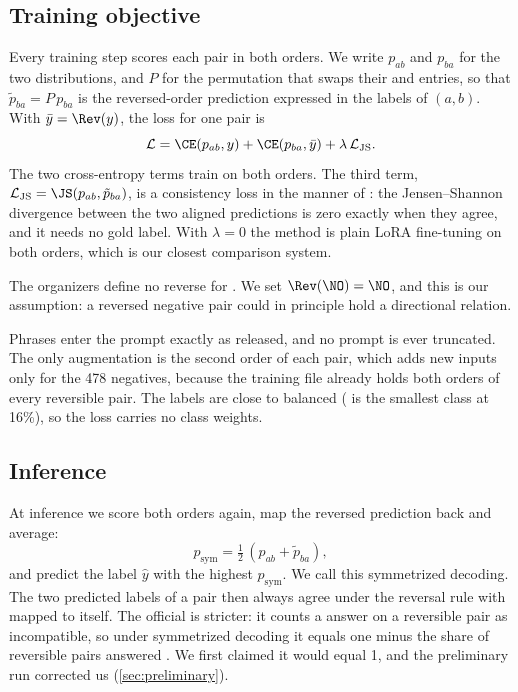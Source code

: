 \subsection{Training objective}

Every training step scores each pair in both orders. We write $p_{ab}$ and $p_{ba}$ for the two distributions, and $P$ for the permutation that swaps their \FW{} and \BW{} entries, so that $\tilde{p}_{ba} = P\,p_{ba}$ is the reversed-order prediction expressed in the labels of $(a,b)$. With $\bar{y} = \Rev(y)$, the loss for one pair is
\begin{equation}
\mathcal{L} = \CE(p_{ab}, y) + \CE(p_{ba}, \bar{y}) + \lambda\, \mathcal{L}_{\mathrm{JS}} .
\label{eq:loss}
\end{equation}
The two cross-entropy terms train on both orders. The third term, $\mathcal{L}_{\mathrm{JS}} = \JS(p_{ab}, \tilde{p}_{ba})$, is a consistency loss in the manner of \citet{li-etal-2019-logic}: the Jensen--Shannon divergence between the two aligned predictions is zero exactly when they agree, and it needs no gold label. With $\lambda = 0$ the method is plain LoRA fine-tuning on both orders, which is our closest comparison system.

The organizers define no reverse for \NO{}. We set $\Rev(\NO) = \NO$, and this is our assumption: a reversed negative pair could in principle hold a directional relation.

Phrases enter the prompt exactly as released, and no prompt is ever truncated. The only augmentation is the second order of each pair, which adds new inputs only for the 478 negatives, because the training file already holds both orders of every reversible pair. The labels are close to balanced (\NO{} is the smallest class at 16\%), so the loss carries no class weights.

\subsection{Inference}

At inference we score both orders again, map the reversed prediction back and average:
\begin{equation}
p_{\mathrm{sym}} = \tfrac{1}{2}\,(p_{ab} + \tilde{p}_{ba}),
\label{eq:sym}
\end{equation}
and predict the label $\hat{y}$ with the highest $p_{\mathrm{sym}}$. We call this symmetrized decoding. The two predicted labels of a pair then always agree under the reversal rule with \NO{} mapped to itself. The official \SoftCons{} is stricter: it counts a \NO{} answer on a reversible pair as incompatible, so under symmetrized decoding it equals one minus the share of reversible pairs answered \NO{}. We first claimed it would equal 1, and the preliminary run corrected us (\cref{sec:preliminary}).

